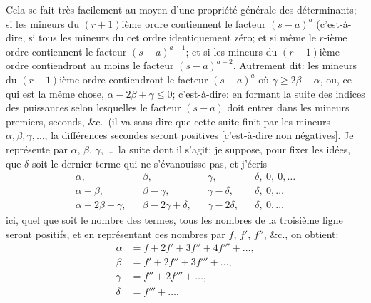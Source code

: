 \documentclass[11pt,a4paper]{article}
\begin{document}
\medskip

Cela se fait tr\`es facilement au moyen d'une propri\'et\'e g\'en\'erale des d\'eterminants; si les mineurs du $(r+1)$i\`eme ordre contiennent le facteur $(s-a)^a$ (c'est-\`a-dire, si tous les mineurs du cet ordre identiquement z\'ero; et si m\^eme le $r$-i\`eme ordre contiennent le facteur $(s-a)^{a-1}$; et si les mineurs du $(r-1)$i\`eme ordre contiendront au moins le facteur $(s-a)^{a-2}$. Autrement dit: les mineurs du $(r-1)$i\`eme ordre contiendront le facteur $(s-a)^a$ o\`u $\gamma \geq 2\beta - \alpha$, ou, ce qui est la m\^eme chose, $\alpha - 2\beta + \gamma \leq 0$; c'est-\`a-dire: en formant la suite des indices des puissances selon lesquelles le facteur $(s - a)$ doit entrer dans les mineurs premiers, seconds, \&c.\ (il va sans dire que cette suite finit par les mineurs $\alpha, \beta, \gamma, \ldots$, la diff\'erences secondes seront positives [c'est-\`a-dire non n\'egatives]. Je repr\'esente par $\alpha$, $\beta$, $\gamma$, \ldots\ la suite dont il s'agit; je suppose, pour fixer les id\'ees, que $\delta$ soit le dernier terme qui ne s'\'evanouisse pas, et j'\'ecris
\[
\begin{array}{ccccccc}
\alpha, & & \beta, & & \gamma, & & \delta,\ 0,\ 0,\ldots\\
\alpha - \beta, & & \beta - \gamma, & & \gamma - \delta, & & \delta,\ 0,\ldots\\
\alpha - 2\beta + \gamma, & & \beta - 2\gamma + \delta, & & \gamma - 2\delta, & & \delta,\ 0,\ldots
\end{array}
\]
ici, quel que soit le nombre des termes, tous les nombres de la troisi\`eme ligne seront positifs, et en repr\'esentant ces nombres par $f$, $f'$, $f''$, \&c., on obtient:
\begin{align*}
\alpha &= f + 2 f' + 3 f'' + 4 f''' + \ldots,\\
\beta &= f' + 2 f'' + 3 f''' + \ldots,\\
\gamma &= f'' + 2 f''' + \ldots,\\
\delta &= f''' + \ldots,
\end{align*}

\medskip
\end{document}
